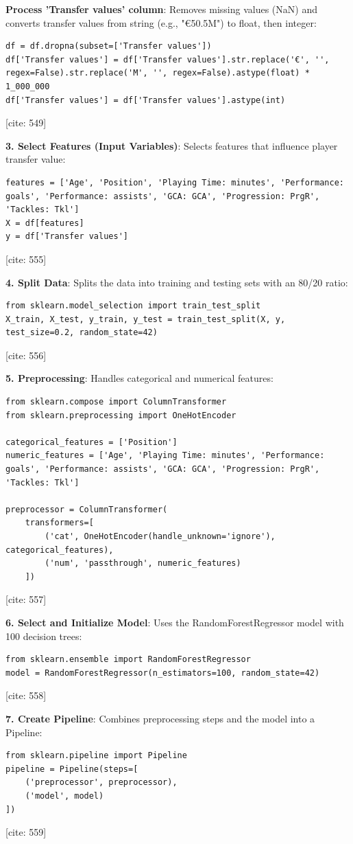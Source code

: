 \documentclass[12pt]{report}
\begin{document}
{{{\textbf{Process 'Transfer values' column}:
Removes missing values (NaN) and converts transfer values from string (e.g., "€50.5M") to float, then integer:
\begin{verbatim}
df = df.dropna(subset=['Transfer values'])
df['Transfer values'] = df['Transfer values'].str.replace('€', '', regex=False).str.replace('M', '', regex=False).astype(float) * 1_000_000
df['Transfer values'] = df['Transfer values'].astype(int)
\end{verbatim} [cite: 549]

\textbf{3. Select Features (Input Variables)}:
Selects features that influence player transfer value:
\begin{verbatim}
features = ['Age', 'Position', 'Playing Time: minutes', 'Performance: goals', 'Performance: assists', 'GCA: GCA', 'Progression: PrgR', 'Tackles: Tkl']
X = df[features]
y = df['Transfer values']
\end{verbatim} [cite: 555]

\textbf{4. Split Data}:
Splits the data into training and testing sets with an 80/20 ratio:
\begin{verbatim}
from sklearn.model_selection import train_test_split
X_train, X_test, y_train, y_test = train_test_split(X, y, test_size=0.2, random_state=42)
\end{verbatim} [cite: 556]

\textbf{5. Preprocessing}:
Handles categorical and numerical features:
\begin{verbatim}
from sklearn.compose import ColumnTransformer
from sklearn.preprocessing import OneHotEncoder

categorical_features = ['Position']
numeric_features = ['Age', 'Playing Time: minutes', 'Performance: goals', 'Performance: assists', 'GCA: GCA', 'Progression: PrgR', 'Tackles: Tkl']

preprocessor = ColumnTransformer(
    transformers=[
        ('cat', OneHotEncoder(handle_unknown='ignore'), categorical_features),
        ('num', 'passthrough', numeric_features)
    ])
\end{verbatim} [cite: 557]

\textbf{6. Select and Initialize Model}:
Uses the RandomForestRegressor model with 100 decision trees:
\begin{verbatim}
from sklearn.ensemble import RandomForestRegressor
model = RandomForestRegressor(n_estimators=100, random_state=42)
\end{verbatim} [cite: 558]

\textbf{7. Create Pipeline}:
Combines preprocessing steps and the model into a Pipeline:
\begin{verbatim}
from sklearn.pipeline import Pipeline
pipeline = Pipeline(steps=[
    ('preprocessor', preprocessor),
    ('model', model)
])
\end{verbatim} [cite: 559]

}}}
\end{document}
